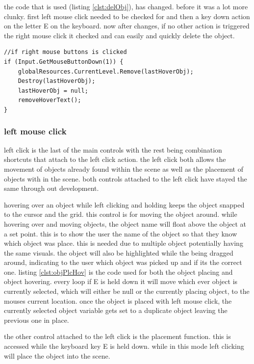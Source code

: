the code that is used (listing \ref{clst:delObj}), has changed. before it was a lot more clunky. first left mouse click needed to be checked for and then a key down action on the letter E on the keyboard. now after changes, if no other action is triggered the right mouse click it checked and can easily and quickly delete the object.

\begin{minipage}{\textwidth}
\begin{lstlisting}[language={[Sharp]C}, caption=delete Object with right click, label=clst:delObj]
//if right mouse buttons is clicked
if (Input.GetMouseButtonDown(1)) {
	globalResources.CurrentLevel.Remove(lastHoverObj);
	Destroy(lastHoverObj);
	lastHoverObj = null;
	removeHoverText();
}
\end{lstlisting}
\end{minipage}

\subsubsection{left mouse click}
left click is the last of the main controls with the rest being combination shortcuts that attach to the left click action. the left click both allows the movement of objects already found within the scene as well as the placement of objects with in the scene. both controls attached to the left click have stayed the same through out development. 

hovering over an object while left clicking and holding keeps the object snapped to the cursor and the grid. this control is for moving the object around. while hovering over and moving objects, the object name will float above the object at a set point. this is to show the user the name of the object so that they know which object was place. this is needed due to multiple object potentially having the same visuals. the object will also be highlighted while the being dragged around, indicating to the user which object was picked up and if its the correct one. listing \ref{clst:objPlcHov} is the code used for both the object placing and object hovering. every loop if E is held down it will move which ever object is currently selected, which will either be null or the currently placing object, to the mouses current location. once the object is placed with left mouse click, the currently selected object variable gets set to a duplicate object leaving the previous one in place.

the other control attached to the left click is the placement function. this is accessed while the keyboard key E is held down. while in this mode left clicking will place the object into the scene.

